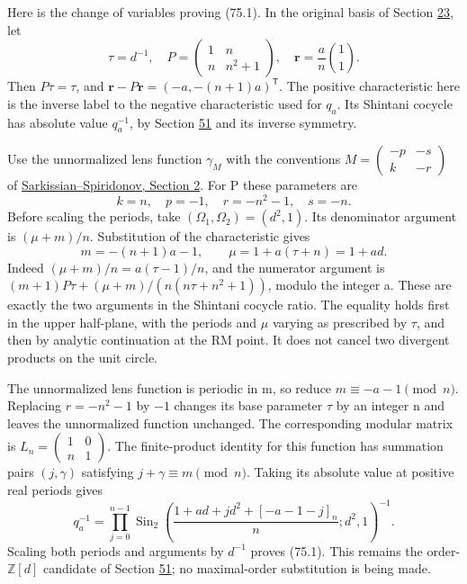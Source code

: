 \documentclass[11pt,reqno]{amsart}
\theoremstyle{plain}
\begin{document}
Here is the change of variables proving (75.1). In the original basis
of Section \hyperref[sec:23]{23}, let
\[
 \tau=d^{-1},\quad
 P=\begin{pmatrix}1&n\\n&n^2+1\end{pmatrix},\quad
 \mathbf r=\frac an\binom11.
\]
Then \(P\tau=\tau\), and
\(\mathbf r-P\mathbf r=(-a,-(n+1)a)^{\mathsf T}\).
The positive characteristic here is the inverse label to the negative
characteristic used for \(q_a\). Its Shintani cocycle has absolute
value \(q_a^{-1}\), by Section \hyperref[sec:51]{51} and its inverse symmetry.

Use the unnormalized lens function \(\gamma_M\) with the conventions
\(M=\left(\begin{smallmatrix}-p&-s\\k&-r\end{smallmatrix}\right)\)
of \href{https://arxiv.org/html/1910.11747\#S2}{Sarkissian--Spiridonov, Section 2}.
For P these parameters are
\[
 k=n,\quad p=-1,\quad r=-n^2-1,\quad s=-n.
\]
Before scaling the periods, take \((\Omega_1,\Omega_2)=(d^2,1)\).
Its denominator argument is \((\mu+m)/n\). Substitution of the
characteristic gives
\begin{equation*}
 m=-(n+1)a-1,\qquad \mu=1+a(\tau+n)=1+ad.
 \tag{75.3}
\end{equation*}
Indeed \((\mu+m)/n=a(\tau-1)/n\), and the numerator argument is
\((m+1)P\tau+(\mu+m)/(n(n\tau+n^2+1))\), modulo the integer a.
These are exactly the two arguments in the Shintani cocycle ratio.
The equality holds first in the upper half-plane, with the periods
and \(\mu\) varying as prescribed by \(\tau\), and then by analytic
continuation at the RM point. It does not cancel two divergent products
on the unit circle.

The unnormalized lens function is periodic in m, so reduce
\(m\equiv-a-1\pmod n\). Replacing \(r=-n^2-1\) by \(-1\)
changes its base parameter \(\tau\) by an integer n and leaves the
unnormalized function unchanged. The corresponding modular matrix is
\(L_n=\left(\begin{smallmatrix}1&0\\n&1\end{smallmatrix}\right)\).
The finite-product identity for this function has summation pairs
\((j,\gamma)\) satisfying \(j+\gamma\equiv m\pmod n\).
Taking its absolute value at positive real periods gives
\[
 q_a^{-1}=\prod_{j=0}^{n-1}
 \operatorname{Sin}_2\!\left(
 \frac{1+ad+jd^2+[-a-1-j]_n}{n};d^2,1\right)^{-1}.
\]
Scaling both periods and arguments by \(d^{-1}\) proves (75.1).
This remains the order-\(\mathbb Z[d]\) candidate of Section \hyperref[sec:51]{51};
no maximal-order substitution is being made.
\end{document}
